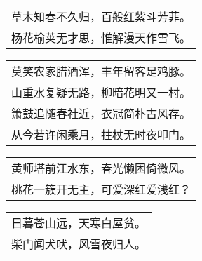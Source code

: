 \noindent\begin{minipage}{\linewidth}
  \vskip-3pt\begin{table}[H]
    \centering
    \begin{tabular}{@{}l@{}}
草木知春不久归，百般红紫斗芳菲。\\
杨花榆荚无才思，惟解漫天作雪飞。
    \end{tabular}
  \end{table}
\end{minipage}
\vspace{1cm}


\noindent\begin{minipage}{\linewidth}
  \vskip-3pt\begin{table}[H]
    \centering
    \begin{tabular}{@{}l@{}}
莫笑农家腊酒浑，丰年留客足鸡豚。\\
山重水复疑无路，柳暗花明又一村。\\
箫鼓追随春社近，衣冠简朴古风存。\\
从今若许闲乘月，拄杖无时夜叩门。
    \end{tabular}
  \end{table}
\end{minipage}
\vspace{1cm}


\noindent\begin{minipage}{\linewidth}
  \vskip-3pt\begin{table}[H]
    \centering
    \begin{tabular}{@{}l@{}}
黄师塔前江水东，春光懒困倚微风。\\
桃花一簇开无主，可爱深红爱浅红？
    \end{tabular}
  \end{table}
\end{minipage}
\vspace{1cm}


\noindent\begin{minipage}{\linewidth}
  \vskip-3pt\begin{table}[H]
    \centering
    \begin{tabular}{@{}l@{}}
日暮苍山远，天寒白屋贫。\\
柴门闻犬吠，风雪夜归人。
    \end{tabular}
  \end{table}
\end{minipage}
\vspace{1cm}


